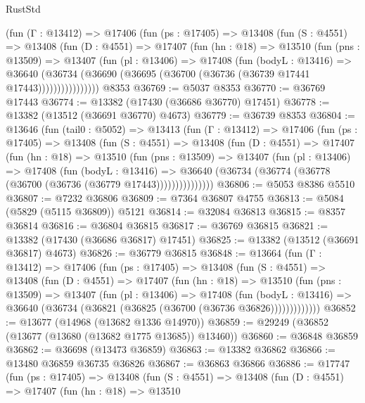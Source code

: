 \begin{lexlean}{RustStd}
\begin{coremodule}
        (fun (Γ : @13412) =>
        @17406
          (fun (ps : @17405) =>
          @13408
            (fun (S : @4551) =>
            @13408
              (fun (D : @4551) =>
              @17407
                (fun (hn : @18) =>
                @13510
                  (fun (pns : @13509) =>
                  @13407
                    (fun (pl : @13406) =>
                    @17408
                      (fun (bodyL : @13416) =>
                      @36640
                        (@36734
                          (@36690 (@36695 (@36700 (@36736 (@36739 @17441 @17443))))))))))))))))
    @8353
@36769 := @5037 @8353
@36770 := @36769 @17443
@36774 := @13382 (@17430 (@36686 @36770) @17451)
@36778 := @13382 (@13512 (@36691 @36770) @4673)
@36779 := @36739 @8353
@36804 := @13646
    (fun (tail0 : @5052) =>
    @13413
      (fun (Γ : @13412) =>
      @17406
        (fun (ps : @17405) =>
        @13408
          (fun (S : @4551) =>
          @13408
            (fun (D : @4551) =>
            @17407
              (fun (hn : @18) =>
              @13510
                (fun (pns : @13509) =>
                @13407
                  (fun (pl : @13406) =>
                  @17408
                    (fun (bodyL : @13416) =>
                    @36640 (@36734 (@36774 (@36778 (@36700 (@36736 (@36779 @17443)))))))))))))))
@36806 := @5053 @8386 @5510
@36807 := @7232 @36806
@36809 := @7364 @36807 @4755
@36813 := @5084 (@5829 (@5115 @36809)) @5121
@36814 := @32084 @36813
@36815 := @8357 @36814
@36816 := @36804 @36815
@36817 := @36769 @36815
@36821 := @13382 (@17430 (@36686 @36817) @17451)
@36825 := @13382 (@13512 (@36691 @36817) @4673)
@36826 := @36779 @36815
@36848 := @13664
    (fun (Γ : @13412) =>
    @17406
      (fun (ps : @17405) =>
      @13408
        (fun (S : @4551) =>
        @13408
          (fun (D : @4551) =>
          @17407
            (fun (hn : @18) =>
            @13510
              (fun (pns : @13509) =>
              @13407
                (fun (pl : @13406) =>
                @17408
                  (fun (bodyL : @13416) =>
                  @36640 (@36734 (@36821 (@36825 (@36700 (@36736 @36826)))))))))))))
@36852 := @13677 (@14968 (@13682 @1336 @14970))
@36859 := @29249 (@36852 (@13677 (@13680 (@13682 @1775 @13685)) @13460))
@36860 := @36848 @36859
@36862 := @36698 (@13473 @36859)
@36863 := @13382 @36862
@36866 := @13480 @36859 @36735 @36826
@36867 := @36863 @36866
@36886 := @17747
    (fun (ps : @17405) =>
    @13408
      (fun (S : @4551) =>
      @13408
        (fun (D : @4551) =>
        @17407
          (fun (hn : @18) =>
          @13510

\end{coremodule}
\end{lexlean}
